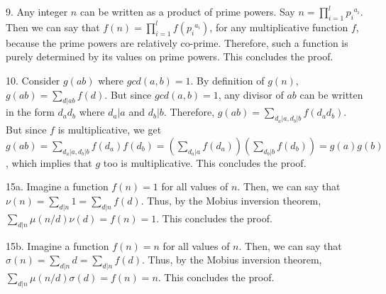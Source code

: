 \documentclass{article}
\begin{document}
9. Any integer $n$ can be written as a product of prime powers. Say $n = \prod_{i = 1}^l {p_i}^{a_i}$. Then we can say that $f(n) = \prod_{i = 1}^l f({p_i}^{a_i})$, for any multiplicative function $f$, because the prime powers are relatively co-prime. Therefore, such a function is purely determined by its values on prime powers. This concludes the proof.

10. Consider $g(ab)$ where $gcd(a, b) = 1$. By definition of $g(n)$, $g(ab) = \sum_{d | ab} f(d)$. But since $gcd(a, b) = 1$, any divisor of $ab$ can be written in the form $d_ad_b$ where $d_a | a$ and $d_b | b$. Therefore, $g(ab) = \sum_{d_a | a, d_b | b} f(d_ad_b)$. But since $f$ is multiplicative, we get $g(ab) = \sum_{d_a | a, d_b | b} f(d_a)f(d_b) = (\sum_{d_a | a} f(d_a))(\sum_{d_b | b} f(d_b)) = g(a)g(b)$, which implies that $g$ too is multiplicative. This concludes the proof.

15a. Imagine a function $f(n) = 1$ for all values of $n$. Then, we can say that $\nu(n) = \sum_{d | n} 1 = \sum_{d | n} f(d)$. Thus, by the Mobius inversion theorem, $\sum_{d | n} \mu(n/d)\nu(d) = f(n) = 1$. This concludes the proof. 

15b. Imagine a function $f(n) = n$ for all values of $n$. Then, we can say that $\sigma(n) = \sum_{d | n} d = \sum_{d | n} f(d)$. Thus, by the Mobius inversion theorem, $\sum_{d | n} \mu(n/d)\sigma(d) = f(n) = n$. This concludes the proof.
\end{document}
